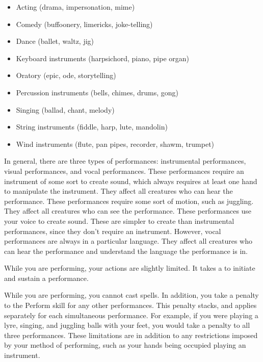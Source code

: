         \begin{itemize}
            \item Acting (drama, impersonation, mime)
            \item Comedy (buffoonery, limericks, joke-telling)
            \item Dance (ballet, waltz, jig)
            \item Keyboard instruments (harpsichord, piano, pipe organ)
            \item Oratory (epic, ode, storytelling)
            \item Percussion instruments (bells, chimes, drums, gong)
            \item Singing (ballad, chant, melody)
            \item String instruments (fiddle, harp, lute, mandolin)
            \item Wind instruments (flute, pan pipes, recorder, shawm, trumpet)
        \end{itemize}

        In general, there are three types of performances: instrumental performances, visual performances, and vocal performances.
         These performances require an instrument of some sort to create sound, which always requires at least one hand to manipulate the instrument.
        They affect all creatures who can hear the performance.
         These performances require some sort of motion, such as juggling.
        They affect all creatures who can see the performance.
         These performances use your voice to create sound.
        These are simpler to create than instrumental performances, since they don't require an instrument.
        However, vocal performances are always in a particular language.
        They affect all creatures who can hear the performance and understand the language the performance is in.

        While you are performing, your actions are slightly limited.
        It takes a  to initiate and sustain a performance.

        While you are performing, you cannot cast spells.
        In addition, you take a  penalty to the Perform skill for any other performances.
        This penalty stacks, and applies separately for each simultaneous performance.
        For example, if you were playing a lyre, singing, and juggling balls with your feet, you would take a  penalty to all three performances.
        These limitations are in addition to any restrictions imposed by your method of performing, such as your hands being occupied playing an instrument.

